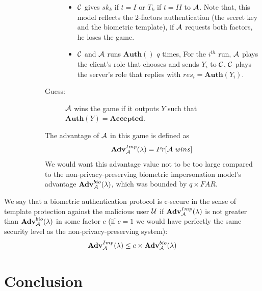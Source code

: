 \begin{description}
\begin{description}
\begin{description}
\begin{itemize}
      \item $\mathcal{C}$ gives $sk_k$ if $t = I$ or $T_k$ if $t = II$ to $\mathcal{A}$. Note that, this model reflects
        the 2-factors authentication (the secret key and the biometric template), if $\mathcal{A}$ requests both factors,
        he loses the game.
      \item $\mathcal{C}$ and $\mathcal{A}$ runs $\mathbf{Auth()}$ $q$ times, For the $i^{th}$ run, $\mathcal{A}$ plays the
        client's role that chooses and sends $Y_i$ to $\mathcal{C}$, $\mathcal{C}$ plays the server's role that replies
        with $res_i = \mathbf{Auth}(Y_i)$.
      \end{itemize}
    \item[Guess:] $\mathcal{A}$ wins the game if it outputs $Y$ such that $\mathbf{Auth}(Y) = \textbf{Accepted}$.
    \end{description}
    The advantage of $\mathcal{A}$ in this game is defined as
    \[
      \textbf{Adv}^{Imp}_{\mathcal{A}}(\lambda) = Pr[\mathcal{A} \ wins] \
    \]
    We would want this advantage value not to be too large compared to the non-privacy-preserving biometric
    impersonation model's advantage $\textbf{Adv}^{bio}_{\mathcal{A}}(\lambda)$, which was bounded by $q \times FAR$.

  \end{description}

\end{description}
\begin{definition}
   We say that a biometric authentication protocol is c-secure in the sense of template
  protection against the malicious user $\mathcal{U}$ if $\textbf{Adv}^{Imp}_{\mathcal{A}}(\lambda)$ is not greater than
  $\textbf{Adv}^{bio}_{\mathcal{A}}(\lambda)$ in some factor $c$ (if $c = 1$ we would have perfectly the same security level
  as the non-privacy-preserving system):
  \[\textbf{Adv}^{Imp}_{\mathcal{A}}(\lambda) \leq c \times \textbf{Adv}^{bio}_{\mathcal{A}}(\lambda)\]
\end{definition}


\section{Conclusion}
